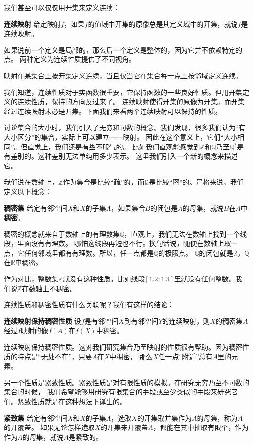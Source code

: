 \documentclass[12pt,UTF8,fontset=none]{ctexbook}
\begin{document}
我们甚至可以仅仅用开集来定义连续：
\begin{df}{\textbf{连续映射}}
    给定映射$f$，如果$f$的值域中开集的原像总是其定义域中的开集，就说$f$是连续映射。
\end{df}

如果说前一个定义是局部的，那么后一个定义是整体的，因为它并不依赖特定的点。
两种定义为连续性质提供了不同视角。

映射在某集合上按开集定义连续，当且仅当它在集合每一点上按邻域定义连续。

我们知道，连续性质对于实函数很重要，它保持函数的一些良好性质。但用开集定义的连续性质，保持的方向反过来了。
连续映射使得开集的原像为开集。而开集经过连续映射未必是开集。下面我们来看两个连续映射可以保持的性质。

讨论集合的大小时，我们引入了无穷和可数的概念。我们发现，很多我们认为“有大小区分”的集合，实际上可以建立一一映射。
因此在这个意义上，它们“大小相同”。但直觉上，我们还是有些不服气的。
比如我们直观能感觉到$\mathbb{Z}$和$\mathbb{Q}$乃至$\mathbb{Q}^2$是有差别的。这种差别无法单纯用多少表示。
这里我们引入一个新的概念来描述它。

我们说在数轴上，$\mathbb{Z}$作为集合是比较“疏”的，而$\mathbb{Q}$是比较“密”的。严格来说，我们定义以下概念：
\begin{df}{\textbf{稠密集}}
    给定有邻空间$X$和$X$的子集$A$，如果集合$B$的闭包是$A$的母集，就说$B$在$A$中\textbf{稠密}。
\end{df}

稠密的概念就来自于数轴上的有理数集$\mathbb{Q}$。直观上，我们无法在数轴上找到一个线段，里面没有有理数。
哪怕这线段再短也不行。换句话说，随便在数轴上取一点，它任何邻域里都有有理数。所以，任一点都是$\mathbb{Q}$的极限点。
$\mathbb{Q}$的闭包就是$\mathbb{R}$，$\mathbb{Q}$在$\mathbb{R}$中稠密。

作为对比，整数集$\mathbb{Z}$就没有这种性质。比如线段$[1.2;1.3]$里就没有任何整数。我们说$\mathbb{Z}$在数轴上不稠密。

连续性质和稠密性质有什么关联呢？我们有这样的结论：
\begin{tm}{\textbf{连续映射保持稠密性质}}
    设$f$是有邻空间$X$到有邻空间$Y$的连续映射，则$X$的稠密集$A$经过$f$映射的像$f(A)$在$f(X)$中稠密。
\end{tm}
连续映射保持稠密性质。这对我们研究集合乃至映射的性质很有帮助。因为稠密性质的特点是“无处不在”，只要$A$在$X$中稠密，
那么$X$任一点“附近”总有$A$里的元素。


另一个性质是紧致性质。紧致性质是对有限性质的模拟。在研究无穷乃至不可数的集合的时候，
我们希望能够用研究有限集合的手段或至少类似的手段来研究它们。紧致性质就是在这种想法下诞生的。
\begin{df}{\textbf{紧致集}}
    给定有邻空间$X$和$X$的子集$A$，选取$X$的开集取并集作为$A$的母集，称为$A$的开覆盖。
    如果无论怎样选取$X$的开集来开覆盖$A$，都能在其中抽取有限个，作为作为$A$的母集，就说$A$是紧致的。
\end{df}
\end{document}
